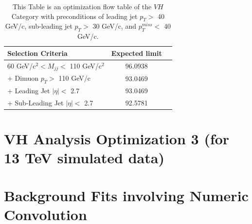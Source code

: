 \documentclass[12pt]{article}
\begin{document}
\begin{table}[!hbtp]
  \begin{center}
    \caption{ \label{tab:ExpectedLimits}
        This Table is an optimization flow table of the $VH$ Category with preconditions of leading jet $p_{T} >$ 40
	GeV/c, sub-leading jet $p_{T} >$ 30 GeV/c, and $p_{T}^{miss} <$ 40 GeV/c.
    }
    \begin{tabular}{lcc} \hline \hline
         Selection Criteria & Expected limit \\ \hline
         60 GeV/c$^{2} < M_{jj} <$ 110 GeV/c$^{2}$ & 96.0938  \\
         + Dimuon $p_{T} >$ 110 GeV/c & 93.0469 \\
	 + Leading Jet $|\eta| <$ 2.7 & 93.0469 \\
	 + Sub-Leading Jet $|\eta| <$ 2.7 & 92.5781 \\
     \hline \hline
    \end{tabular}
  \end{center}
\end{table}

\section{VH Analysis Optimization 3 (for 13 TeV simulated data)}

\section{Background Fits involving Numeric Convolution}
\end{document}
